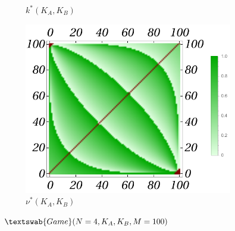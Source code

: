 \documentclass{beamer}
\theoremstyle{definition}
\newcommand{\G}[1]{$\textswab{Game}(#1)$}
\begin{document}
\begin{frame}[shrink=40]
\begin{figure}[H]
\begin{subfigure}[b]{0.3\textwidth}
        \caption{\small \centering $k^*(K_A,K_B)$}
        \label{fig:Game4__100_k}
    \end{subfigure}
    \hfill %
    \begin{subfigure}[b]{0.3\textwidth}
        \includegraphics[width=\textwidth]{img/nu_Plot_4_100.pdf}
        \caption{\small \centering $\nu^*(K_A,K_B)$}
        \label{fig:Game4__100_nu}
    \end{subfigure}
    
    \caption{\G{N=4,K_A,K_B,M=100}}
    \label{fig:Game4__100_Pknu}
\end{figure}



\end{frame}
\end{document}
